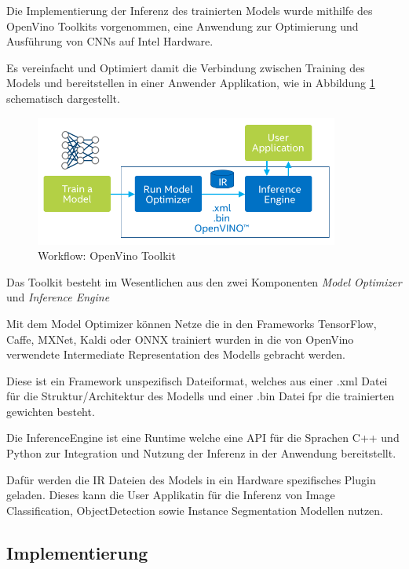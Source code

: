 Die Implementierung der Inferenz des trainierten Models wurde 
mithilfe des OpenVino Toolkits vorgenommen, eine Anwendung 
zur Optimierung und Ausführung von CNNs auf Intel Hardware.

Es vereinfacht und Optimiert damit die Verbindung zwischen 
Training des Models und bereitstellen in einer Anwender 
Applikation, wie in Abbildung \ref{img:openvinoworkflow} 
schematisch dargestellt.

\begin{figure}[htb]
    \centering
    \includegraphics[width=10cm]{./Bilder/open_vino_workflow_steps.png}
    \caption{Workflow: OpenVino Toolkit}
    \label{img:openvinoworkflow}
\end{figure}

Das Toolkit besteht im Wesentlichen aus den zwei Komponenten 
\textit{Model Optimizer} und \textit{Inference Engine}

Mit dem Model Optimizer können Netze die in den Frameworks 
TensorFlow, Caffe, MXNet, Kaldi oder ONNX trainiert wurden 
in die von OpenVino verwendete Intermediate Representation 
des Modells gebracht werden.

Diese ist ein Framework unspezifisch Dateiformat, welches aus 
einer .xml Datei für die Struktur/Architektur des Modells
und einer .bin Datei fpr die trainierten gewichten besteht.


Die InferenceEngine ist eine Runtime welche eine API für die 
Sprachen C++ und Python zur Integration und Nutzung der Inferenz 
in der Anwendung bereitstellt.

Dafür werden die IR Dateien des Models in ein Hardware spezifisches 
Plugin geladen. Dieses kann die User Applikatin für die Inferenz 
von Image Classification, ObjectDetection sowie Instance Segmentation
Modellen nutzen.



\subsection*{Implementierung}

